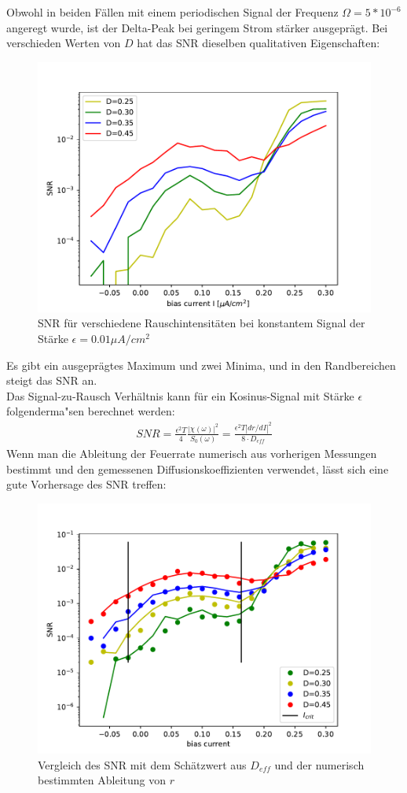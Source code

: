 \documentclass[12pt,a4paper]{article}
\begin{document}
Obwohl in beiden Fällen mit einem periodischen Signal der Frequenz $\Omega=5*10^{-6}$ angeregt wurde, ist der Delta-Peak bei geringem Strom stärker ausgeprägt. Bei verschieden Werten von $D$ hat das SNR dieselben qualitativen Eigenschaften:
\begin{figure}[H]
	\centering
	\includegraphics[scale=1]{snronly.pdf}\caption{SNR für verschiedene Rauschintensitäten bei konstantem Signal der Stärke $\epsilon=0.01 \mu A/cm^2$}
	\label{snr}
\end{figure}
Es gibt ein ausgeprägtes Maximum und zwei Minima, und in den Randbereichen steigt das SNR an. 
\\
Das Signal-zu-Rausch Verhältnis kann für ein Kosinus-Signal mit Stärke $\epsilon$ folgenderma"sen berechnet werden:
\begin{align*}
SNR=\frac{\epsilon ^2T}{4}\frac{|\chi(\omega)|^2}{S_0(\omega)}=\frac{\epsilon^2T|dr/dI|^2}{8\cdot D_{eff}}
\end{align*}
Wenn man die Ableitung der Feuerrate numerisch aus vorherigen Messungen bestimmt und den gemessenen Diffusionskoeffizienten verwendet, lässt sich eine gute Vorhersage des SNR treffen:
\begin{figure}[H]
	\centering
	\includegraphics[scale=1]{snrdeffrate.pdf}\caption{Vergleich des SNR mit dem Schätzwert aus $D_{eff}$ und der numerisch bestimmten Ableitung von $r$}
	\label{snrdeffrate}
\end{figure}
\end{document}
